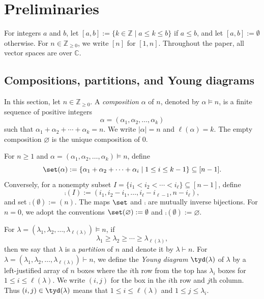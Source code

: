 \documentclass[12pt, reqno]{amsart}
\numberwithin{equation}{section}
\numberwithin{figure}{section}
\numberwithin{table}{section}
\theoremstyle{definition}
\def\Z{\mathbb Z}
\def\C{\mathbb C}
\begin{document}
\section{Preliminaries}\label{Sec: preliminaries}

For integers $a$ and $b$, let $[a,b]:=\{k\in \Z\mid a\le k\le b\}$ if $a\le b$, and let $[a,b]:=\emptyset$ otherwise. 
For $n \in \Z_{\ge0}$, we write $[n]$ for $[1,n]$.
Throughout the paper, all vector spaces are over $\C$.


\subsection{Compositions, partitions, and Young diagrams}
\label{subsec: comp and diag prelim}

In this section, let $n \in \Z_{\ge 0}$.
A \emph{composition} $\alpha$ of $n$, denoted by $\alpha\models n$, is a finite sequence of positive integers
\[
\alpha=(\alpha_1,\alpha_2,\ldots,\alpha_k)
\]
such that $\alpha_1+\alpha_2+\cdots+\alpha_k=n$. We write
$|\alpha|=n$ and $\ell(\alpha)=k$. The empty composition $\varnothing$ is the unique composition of $0$.

For $n \ge 1$ and $\alpha=(\alpha_1,\alpha_2,\ldots,\alpha_k)\models n$, define
\[
\set(\alpha):=
\{\alpha_1+\alpha_2+\cdots+\alpha_i\mid 1\le i\le k-1\}
\subseteq[n-1].
\]
Conversely, for a nonempty subset
$I=\{i_1<i_2<\cdots<i_\ell\}\subseteq [n-1]$, define
\[
\comp(I) := (i_1,i_2-i_1,\ldots,i_\ell-i_{\ell-1},n-i_\ell),
\]
and set $\comp(\emptyset):=(n)$.
The maps $\set$ and $\comp$ are mutually inverse bijections.
For $n=0$, we adopt the conventions $\set(\varnothing):=\emptyset$ and $\comp(\emptyset):=\varnothing$.

For $\lambda=(\lambda_1,\lambda_2,\ldots,\lambda_{\ell(\lambda)})\models n$, if
\[
\lambda_1\ge \lambda_2\ge\cdots\ge \lambda_{\ell(\lambda)},
\]
then we say that $\lambda$ is a \emph{partition} of $n$ and denote it by $\lambda\vdash n$.
For $\lambda=(\lambda_1,\lambda_2,\ldots,\lambda_{\ell(\lambda)})\vdash n$, we define the \emph{Young diagram} $\tyd(\lambda)$ of $\lambda$ by a left-justified array of $n$ boxes where the $i$th row from the top has $\lambda_i$ boxes for $1 \le i \le \ell(\lambda)$. 
We write $(i,j)$ for the box in the $i$th row and $j$th column. 
Thus $(i,j)\in\tyd(\lambda)$ means that $1\le i\le \ell(\lambda)$ and $1\le j\le \lambda_i$.
\end{document}
